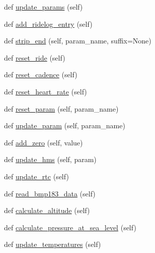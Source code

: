 \begin{DoxyCompactItemize}
\item 
def \hyperlink{classride__parameters_1_1ride__parameters_ae69dbac396ca79bc9f00d68c5acd2150}{update\+\_\+params} (self)
\item 
def \hyperlink{classride__parameters_1_1ride__parameters_ad0d886eb956cb3bcb8be953e03e6dab6}{add\+\_\+ridelog\+\_\+entry} (self)
\item 
def \hyperlink{classride__parameters_1_1ride__parameters_a5d2ad4b83bce4e8391cf0d702304686f}{strip\+\_\+end} (self, param\+\_\+name, suffix=None)
\item 
def \hyperlink{classride__parameters_1_1ride__parameters_a36178e22c36591cb24b08974e5123f27}{reset\+\_\+ride} (self)
\item 
def \hyperlink{classride__parameters_1_1ride__parameters_a8aab50a51a67d682e97834e178996d12}{reset\+\_\+cadence} (self)
\item 
def \hyperlink{classride__parameters_1_1ride__parameters_a41f168d7dcd81c7be64f104cabc9c84a}{reset\+\_\+heart\+\_\+rate} (self)
\item 
def \hyperlink{classride__parameters_1_1ride__parameters_acdb03382d51f8c03d4e0dbe347ddadb4}{reset\+\_\+param} (self, param\+\_\+name)
\item 
def \hyperlink{classride__parameters_1_1ride__parameters_ab01d91e41b6d2941f3d00905d29d3d23}{update\+\_\+param} (self, param\+\_\+name)
\item 
def \hyperlink{classride__parameters_1_1ride__parameters_a1bb15203890685c84d01ea5d37fe187b}{add\+\_\+zero} (self, value)
\item 
def \hyperlink{classride__parameters_1_1ride__parameters_aa74512ad30be2ec2784970e652649e93}{update\+\_\+hms} (self, param)
\item 
def \hyperlink{classride__parameters_1_1ride__parameters_a2b033c42e41b36aae293722ffc0cc6e8}{update\+\_\+rtc} (self)
\item 
def \hyperlink{classride__parameters_1_1ride__parameters_a4d605f8c78e7706137ffa0986bfbe648}{read\+\_\+bmp183\+\_\+data} (self)
\item 
def \hyperlink{classride__parameters_1_1ride__parameters_aca823f7f23e4df91deef267181f18d74}{calculate\+\_\+altitude} (self)
\item 
def \hyperlink{classride__parameters_1_1ride__parameters_ad0a7d33f14fc5e84aa546370f8c480c1}{calculate\+\_\+pressure\+\_\+at\+\_\+sea\+\_\+level} (self)
\item 
def \hyperlink{classride__parameters_1_1ride__parameters_a837da94b5443d9ee3f2b4fe800f5e3d3}{update\+\_\+temperatures} (self)

\end{DoxyCompactItemize}
